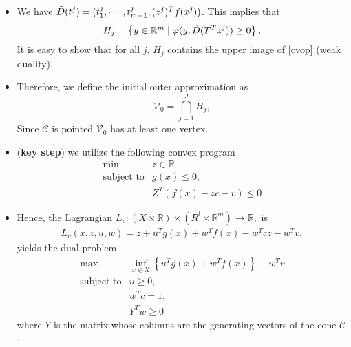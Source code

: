 \documentclass[10pt,xcolor={table,dvipsnames},t,unknownkeysallowed]{beamer}
\newcommand{\R}{\mathbb{R}}
\newcommand{\cone}[1]{\mathcal{#1}}
\begin{document}
\begin{frame}{}
    \begin{itemize}
        \item We have $\Tilde{D}(t^j)=(t^j_1,\cdots,t^j_{m-1}, (z^j)^Tf(x^j))$. This implies that
        \[
          H_j=\left\{y\in \R^m\;|\; \varphi(y,\Tilde{D}(T^Tz^j))\geq 0 \right\},
        \]
        It is easy to show that for all $j$, $H_j$ contains the upper image of \eqref{cvop} (weak duality).
        \item Therefore, we define the initial outer approximation as
        \[
        \cone{V}_0 = \bigcap_{j=1}^JH_j,
        \]
        Since $\cone{C}$ is pointed $\cone{V_0}$ has at least one vertex.
        \item (\textbf{\alert{key step}}) we utilize the following convex program 
        \begin{equation}\label{vsp-cvop} \tag{vs-VOP$_v$-P}
         \begin{array}{ll}
        \min& z\in \R\\
        \text{subject to}& g(x)\leq 0, \;\; \\
        & Z^T\left(f(x)-zc-v \right)\leq 0
    	   \end{array}
    \end{equation}
    \end{itemize}
\end{frame}
\begin{frame}{}
    \begin{itemize}
        \item Hence, the Lagrangian $L_v : (X \times \R) \times (R^l \times \R^m ) \to \R,$ is
        \begin{equation}\label{lagrangian_v}
        \begin{array}{c}
             L_v(x,z, u, w) = z + u^T g(x) + w^T f(x) − w^T cz − w^T v, 
        \end{array}
        \end{equation}
yields the dual problem
        \begin{equation}\label{vsd-cvop} \tag{vs-VOP$_v$-D}
         \begin{array}{ll}
        \max& \inf_{x\in X}\left\{u^Tg(x)+w^Tf(x)\right\}-w^Tv\\
        \text{subject to}& u\geq 0, \;\; \\
        & w^Tc=1, \\
        & Y^Tw\geq 0
    	   \end{array}
    \end{equation}
    where $Y$ is the matrix whose columns are the generating vectors of the cone $\cone{C}$.
    \end{itemize}
\end{frame}
\end{document}
